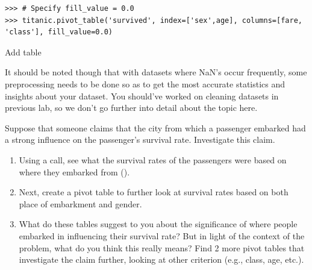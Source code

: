 \begin{lstlisting}
>>> # Specify fill_value = 0.0
>>> titanic.pivot_table('survived', index=['sex',age], columns=[fare, 'class'], fill_value=0.0)
\end{lstlisting}

Add table

It should be noted though that with datasets where NaN's occur frequently, some preprocessing needs to be done so as to get the most accurate statistics and insights about your dataset. You should've worked on cleaning datasets in previous lab, so we don't go further into detail about the topic here.

\begin{problem}
Suppose that someone claims that the city from which a passenger embarked had a strong influence on the passenger's survival rate. Investigate this claim.
\begin{enumerate}
\item Using a  call, see what the survival rates of the passengers were based on where they embarked from ().
\item Next, create a pivot table to further look at survival rates based on both place of embarkment and gender.
\item What do these tables suggest to you about the significance of where people embarked in influencing their survival rate? But in light of the context of the problem, what do you think this really means? Find 2 more pivot tables that investigate the claim further, looking at other criterion (e.g., class, age, etc.).
\end{enumerate}
\end{problem}












